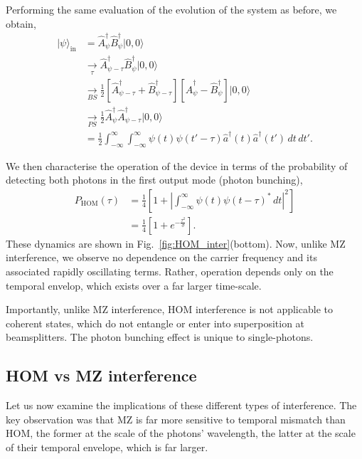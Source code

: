 \documentclass[aps, rmp, twocolumn, amsmath, amssymb, nofootinbib, superscriptaddress, longbibliography, floatfix, table-of-contents, eqsecnum]{revtex4-1}
\newcommand{\ket}[1]{|#1\rangle}
\begin{document}
Performing the same evaluation of the evolution of the system as before, we obtain,
\begin{align}
	\ket\psi_\text{in} &= \hat{A}^\dag_\psi \hat{B}^\dag_\psi \ket{0,0} \nonumber \\
	&\underset{\tau}{\to} \hat{A}^\dag_{\psi-\tau} \hat{B}^\dag_\psi \ket{0,0} \nonumber \\
	&\underset{BS}{\to} \frac{1}{2} [\hat{A}^\dag_{\psi-\tau} + \hat{B}^\dag_{\psi-\tau}] [\hat{A}^\dag_\psi - \hat{B}^\dag_\psi] \ket{0,0} \nonumber \\
	&\underset{PS}{\to} \frac{1}{2} \hat{A}^\dag_\psi \hat{A}^\dag_{\psi-\tau} \ket{0,0} \nonumber \\
	&= \frac{1}{2} \int_{-\infty}^\infty \int_{-\infty}^\infty \psi(t)\psi(t'-\tau)\hat{a}^\dag(t)\hat{a}^\dag(t')\,dt\,dt'.
\end{align}

We then characterise the operation of the device in terms of the probability of detecting both photons in the first output mode (photon bunching),
\begin{align}
	P_\text{HOM}(\tau) &= \frac{1}{4} \left[1 + \left|\int_{-\infty}^\infty \psi(t)\psi(t-\tau)^*\,dt\right|^2 \right] \nonumber \\
	&= \frac{1}{4}\left[ 1 + e^{-\frac{\tau^2}{\sigma}} \right].
\end{align}
These dynamics are shown in Fig.~\ref{fig:HOM_inter}(bottom). Now, unlike MZ interference, we observe no dependence on the carrier frequency and its associated rapidly oscillating terms. Rather, operation depends only on the temporal envelop, which exists over a far larger time-scale.

Importantly, unlike MZ interference, HOM interference is not applicable to coherent states, which do not entangle or enter into superposition at beamsplitters. The photon bunching effect is unique to single-photons.

%
%

\subsection{HOM vs MZ interference} 

Let us now examine the implications of these different types of interference. The key observation was that MZ is far more sensitive to temporal mismatch than HOM, the former at the scale of the photons' wavelength, the latter at the scale of their temporal envelope, which is far larger.
\end{document}
